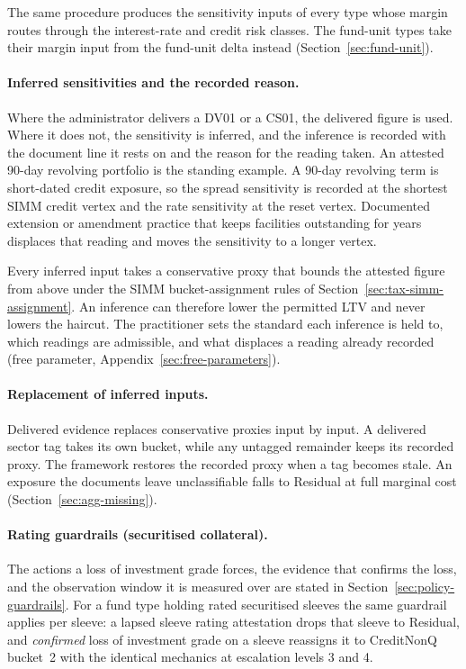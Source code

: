 The same procedure produces the sensitivity inputs of every type whose margin routes through the interest-rate and credit risk classes. The fund-unit types take their margin input from the fund-unit delta instead (Section~\ref{sec:fund-unit}).

\paragraph{Inferred sensitivities and the recorded reason.} Where the administrator delivers a DV01 or a CS01, the delivered figure is used. Where it does not, the sensitivity is inferred, and the inference is recorded with the document line it rests on and the reason for the reading taken. An attested 90-day revolving portfolio is the standing example. A 90-day revolving term is short-dated credit exposure, so the spread sensitivity is recorded at the shortest SIMM credit vertex and the rate sensitivity at the reset vertex. Documented extension or amendment practice that keeps facilities outstanding for years displaces that reading and moves the sensitivity to a longer vertex.

Every inferred input takes a conservative proxy that bounds the attested figure from above under the SIMM bucket-assignment rules of Section~\ref{sec:tax-simm-assignment}. An inference can therefore lower the permitted LTV and never lowers the haircut. The practitioner sets the standard each inference is held to, which readings are admissible, and what displaces a reading already recorded (free parameter, Appendix~\ref{sec:free-parameters}).

\paragraph{Replacement of inferred inputs.} Delivered evidence replaces conservative proxies input by input. A delivered sector tag takes its own bucket, while any untagged remainder keeps its recorded proxy. The framework restores the recorded proxy when a tag becomes stale. An exposure the documents leave unclassifiable falls to Residual at full marginal cost (Section~\ref{sec:agg-missing}).

\paragraph{Rating guardrails (securitised collateral).} The actions a loss of investment grade forces, the evidence that confirms the loss, and the observation window it is measured over are stated in Section~\ref{sec:policy-guardrails}. For a fund type holding rated securitised sleeves the same guardrail applies per sleeve: a lapsed sleeve rating attestation drops that sleeve to Residual, and \emph{confirmed} loss of investment grade on a sleeve reassigns it to CreditNonQ bucket~2 with the identical mechanics at escalation levels 3 and 4.

